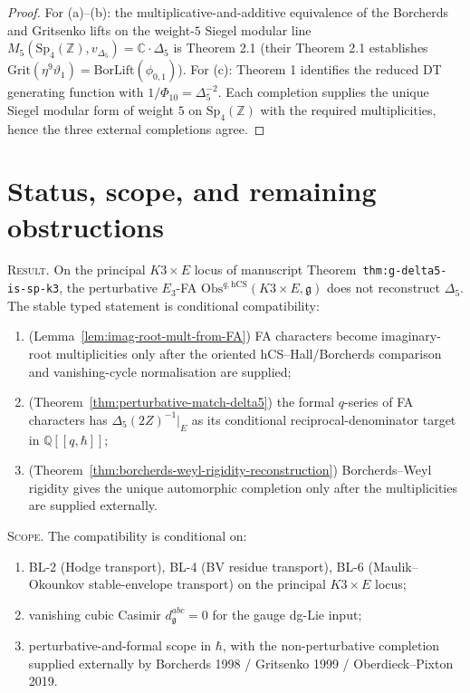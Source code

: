 \documentclass[11pt]{amsart}
\providecommand{\C}{\mathbb{C}}
\providecommand{\Z}{\mathbb{Z}}
\providecommand{\Q}{\mathbb{Q}}
\providecommand{\frakg}{\mathfrak{g}}
\providecommand{\Sp}{\mathrm{Sp}}
\providecommand{\Obs}{\mathrm{Obs}}
\providecommand{\hCS}{\mathrm{hCS}}
\providecommand{\Ethree}{E_{3}}
\providecommand{\BorLift}{\mathrm{BorLift}}
\providecommand{\Grit}{\mathrm{Grit}}
\theoremstyle{plain}
\theoremstyle{definition}
\theoremstyle{remark}
\begin{document}
\begin{proof}
For (a)--(b): the multiplicative-and-additive equivalence of the
Borcherds and Gritsenko lifts on the weight-$5$ Siegel modular line
$M_{5}(\Sp_{4}(\Z),v_{\Delta_{5}})=\C\cdot\Delta_{5}$ is
\cite{GritsenkoNikulin1995} Theorem 2.1 (their Theorem 2.1 establishes
$\Grit(\eta^{9}\vartheta_{1})=\BorLift(\phi_{0,1})$). For (c):
\cite{OberdieckPixton2019} Theorem 1 identifies the reduced DT generating
function with $1/\Phi_{10}=\Delta_{5}^{-2}$. Each completion supplies
the unique Siegel modular form of weight $5$ on $\Sp_{4}(\Z)$ with the
required multiplicities, hence the three external completions agree.
\end{proof}

\section{Status, scope, and remaining obstructions}
\label{sec:status-scope-remaining}

\textsc{Result.} On the principal $K3\times E$ locus of manuscript
Theorem~\texttt{thm:g-delta5-is-sp-k3}, the perturbative $\Ethree$-FA
$\Obs^{q,\hCS}(K3\times E,\frakg)$ does not reconstruct $\Delta_{5}$.
The stable typed statement is conditional compatibility:
\begin{enumerate}
\item[(R1)] (Lemma~\ref{lem:imag-root-mult-from-FA}) FA characters
become imaginary-root multiplicities only after the oriented
hCS--Hall/Borcherds comparison and vanishing-cycle normalisation are
supplied;
\item[(R2)] (Theorem~\ref{thm:perturbative-match-delta5}) the formal
$q$-series of FA characters has $\Delta_{5}(2Z)^{-1}|_{E}$ as its
conditional reciprocal-denominator target in $\Q[\![q,\hbar]\!]$;
\item[(R3)] (Theorem~\ref{thm:borcherds-weyl-rigidity-reconstruction})
Borcherds--Weyl rigidity gives the unique automorphic completion only
after the multiplicities are supplied externally.
\end{enumerate}

\textsc{Scope.} The compatibility is conditional on:
\begin{enumerate}
\item[(S1)] BL-2 (Hodge transport), BL-4 (BV residue transport), BL-6
(Maulik--Okounkov stable-envelope transport) on the principal
$K3\times E$ locus;
\item[(S2)] vanishing cubic Casimir $d^{abc}_{\frakg}=0$ for the gauge
dg-Lie input;
\item[(S3)] perturbative-and-formal scope in $\hbar$, with the
non-perturbative completion supplied externally by Borcherds 1998 /
Gritsenko 1999 / Oberdieck--Pixton 2019.
\end{enumerate}
\end{document}

